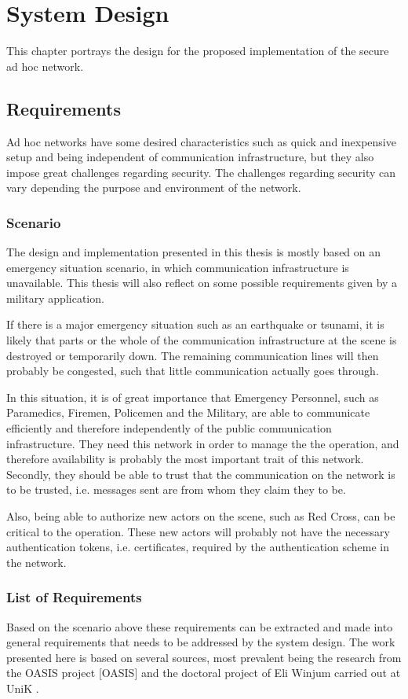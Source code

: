 \chapter{System Design}
This chapter portrays the design for the proposed implementation of the secure
ad hoc network.

\section{Requirements}
Ad hoc networks have some desired characteristics such as quick and inexpensive
setup and being independent of communication infrastructure, but they
also impose great challenges regarding security. The challenges
regarding security can vary depending the purpose and environment of the
network.

\subsection{Scenario}
The design and implementation presented in this thesis is mostly based on an
emergency situation scenario, in which communication infrastructure is
unavailable. This thesis will also reflect on some possible requirements given
by a military application.

If there is a major emergency situation such as an earthquake or tsunami, it is
likely that parts or the whole of the communication infrastructure at the scene
is destroyed or temporarily down. The remaining communication lines will then
probably be congested, such that little communication actually goes through.

In this situation, it is of great importance that Emergency Personnel, such as
Paramedics, Firemen, Policemen and the Military, are able to communicate
efficiently and therefore independently of the public communication
infrastructure. They need this network in order to manage the the operation, and
therefore availability is probably the most important trait of this network.
Secondly, they should be able to trust that the communication on the network is to be
trusted, i.e. messages sent are from whom they claim they to be.

Also, being able to authorize new actors on the scene, such as Red Cross, can be
critical to the operation. These new actors will probably not have the necessary
authentication tokens, i.e. certificates, required by the authentication scheme
in the network.

\subsection{List of Requirements}
Based on the scenario above these requirements can be extracted and made into
general requirements that needs to be addressed by the system design. The work
presented here is based on several sources, most prevalent being the research
from the OASIS project [OASIS] and the doctoral project of Eli Winjum carried
out at UniK \cite{ffi_2005_04015}.

